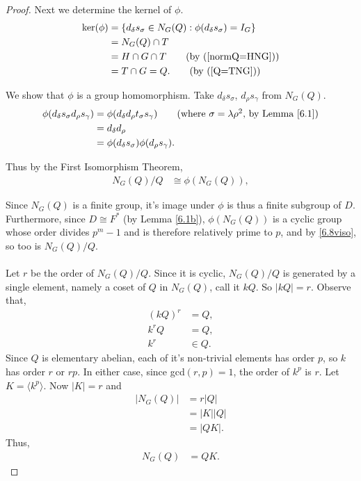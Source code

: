 \begin{proof}
Next we determine the kernel of $\phi$.
\begin{align*} \ker(\phi) &= \{ d_\delta s_\sigma \in N_G(Q) : \phi(d_\delta s_\sigma) = I_G \}
\\ &= N_G(Q) \cap T
\\ &= H \cap G \cap T \tag{by (\ref{normQ=HNG})}
\\ &= T \cap G = Q. \tag{by (\ref{Q=TNG})}
\end{align*}

We show that $\phi$ is a group homomorphism. Take $d_\delta s_\sigma$, $d_\rho s_\gamma$ from $ N_G(Q)$.
\begin{align*} \phi(d_\delta s_\sigma d_\rho s_\gamma) &= \phi(d_\delta d_\rho t_\sigma s_\gamma) \tag{where $\sigma = \lambda \rho^2$, by Lemma \ref{6.1}}
\\ &= d_\delta d_\rho
\\ &= \phi(d_\delta s_\sigma) \phi(d_\rho s_\gamma).
\end{align*}

Thus by the First Isomorphism Theorem,
\begin{align}\label{6.8viso} N_G(Q) / Q &\cong \phi(N_G(Q)),
\end{align}

Since $N_G(Q)$ is a finite group, it's image under $\phi$ is thus a finite subgroup of $D$. Furthermore, since $D \cong F^*$ (by Lemma \ref{6.1b}), $\phi(N_G(Q))$ is a cyclic group whose order divides $p^m-1$ and is therefore relatively prime to $p$, and by \eqref{6.8viso}, so too is $N_G(Q) / Q$. \\
\\
Let $r$ be the order of $N_G(Q) / Q$. Since it is cyclic, $N_G(Q)/Q$ is generated by a single element, namely a coset of $Q$ in $N_G(Q)$, call it $kQ$. So $|kQ| = r$. Observe that,
\begin{align*} (kQ)^r &= Q,
\\ k^rQ &= Q,
\\ k^r &\in Q.
\end{align*}
Since $Q$ is elementary abelian, each of it's non-trivial elements has order $p$, so $k$ has order $r$ or $rp$. In either case, since gcd$(r,p)=1$, the order of $k^p$ is $r$. Let $K = \langle k^p \rangle$. Now $|K| = r$ and
\begin{align*} |N_G(Q)| &= r|Q|
\\ &= |K||Q|
\\ &= |QK|. \tag{since $Q \cap K = I_G$} 
\end{align*}
Thus,
\begin{align}\label{QK} N_G(Q) &= QK.
\end{align}


\end{proof}
